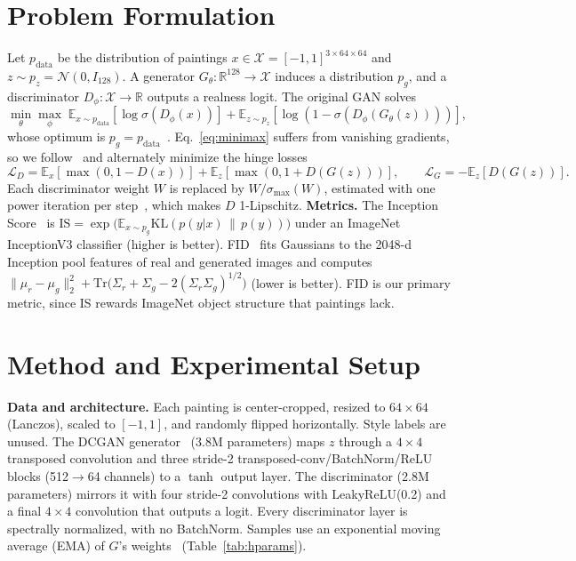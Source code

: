 \documentclass{article}
\begin{document}
\section{Problem Formulation}
\label{sec:formulation}
Let $p_{\text{data}}$ be the distribution of paintings $x\in\mathcal{X}=[-1,1]^{3\times64\times64}$ and $z\sim p_z=\mathcal{N}(0,I_{128})$. A generator $G_\theta:\mathbb{R}^{128}\to\mathcal{X}$ induces a distribution $p_g$, and a discriminator $D_\phi:\mathcal{X}\to\mathbb{R}$ outputs a realness logit. The original GAN solves
\begin{equation}
\textstyle\min_\theta\max_\phi\; \mathbb{E}_{x\sim p_{\text{data}}}\!\left[\log\sigma(D_\phi(x))\right]+\mathbb{E}_{z\sim p_z}\!\left[\log\!\left(1-\sigma(D_\phi(G_\theta(z)))\right)\right],
\label{eq:minimax}
\end{equation}
whose optimum is $p_g=p_{\text{data}}$~\cite{goodfellow2014gan}. Eq.~\eqref{eq:minimax} suffers from vanishing gradients, so we follow~\cite{lim2017geometric,miyato2018sn} and alternately minimize the hinge losses
\begin{equation}
\textstyle\mathcal{L}_D=\mathbb{E}_{x}\left[\max(0,1-D(x))\right]+\mathbb{E}_{z}\left[\max(0,1+D(G(z)))\right],\qquad
\mathcal{L}_G=-\mathbb{E}_{z}\left[D(G(z))\right].
\label{eq:hinge}
\end{equation}
Each discriminator weight $W$ is replaced by $W/\sigma_{\max}(W)$, estimated with one power iteration per step~\cite{miyato2018sn}, which makes $D$ 1-Lipschitz.
\textbf{Metrics.} The Inception Score~\cite{salimans2016improved} is $\mathrm{IS}=\exp\big(\mathbb{E}_{x\sim p_g}\mathrm{KL}(p(y|x)\,\|\,p(y))\big)$ under an ImageNet InceptionV3 classifier (higher is better). FID~\cite{heusel2017gans} fits Gaussians to the 2048-d Inception pool features of real and generated images and computes $\|\mu_r-\mu_g\|_2^2+\mathrm{Tr}\big(\Sigma_r+\Sigma_g-2(\Sigma_r\Sigma_g)^{1/2}\big)$ (lower is better). FID is our primary metric, since IS rewards ImageNet object structure that paintings lack.

\section{Method and Experimental Setup}
\textbf{Data and architecture.} Each painting is center-cropped, resized to $64\times64$ (Lanczos), scaled to $[-1,1]$, and randomly flipped horizontally. Style labels are unused. The DCGAN generator~\cite{radford2016dcgan} (3.8M parameters) maps $z$ through a $4\times4$ transposed convolution and three stride-2 transposed-conv/BatchNorm/ReLU blocks (512$\to$64 channels) to a $\tanh$ output layer. The discriminator (2.8M parameters) mirrors it with four stride-2 convolutions with LeakyReLU(0.2) and a final $4\times4$ convolution that outputs a logit. Every discriminator layer is spectrally normalized, with no BatchNorm. Samples use an exponential moving average (EMA) of $G$'s weights~\cite{yazici2019unusual} (Table~\ref{tab:hparams}).
\end{document}
